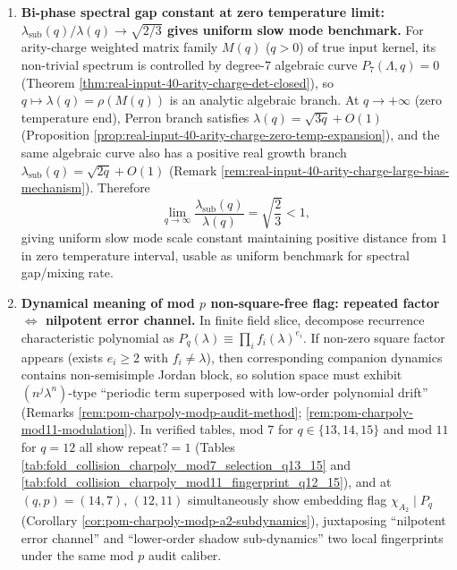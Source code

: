 \begin{enumerate}
  \item \textbf{Bi-phase spectral gap constant at zero temperature limit: \texorpdfstring{$\lambda_{\mathrm{sub}}(q)/\lambda(q)\to\sqrt{2/3}$}{lambda_sub/lambda -> sqrt(2/3)} gives uniform slow mode benchmark.}
  For arity-charge weighted matrix family \(M(q)\) (\(q>0\)) of true input kernel, its non-trivial spectrum is controlled by degree-\(7\) algebraic curve \(P_7(\Lambda,q)=0\) (Theorem \ref{thm:real-input-40-arity-charge-det-closed}), so \(q\mapsto\lambda(q)=\rho(M(q))\) is an analytic algebraic branch.
  At \(q\to+\infty\) (zero temperature end), Perron branch satisfies
  \(
  \lambda(q)=\sqrt{3q}+O(1)
  \)
  (Proposition \ref{prop:real-input-40-arity-charge-zero-temp-expansion}), and the same algebraic curve also has a positive real growth branch
  \(
  \lambda_{\mathrm{sub}}(q)=\sqrt{2q}+O(1)
  \)
  (Remark \ref{rem:real-input-40-arity-charge-large-bias-mechanism}).
  Therefore
  \[
  \lim_{q\to\infty}\frac{\lambda_{\mathrm{sub}}(q)}{\lambda(q)}=\sqrt{\frac{2}{3}}<1,
  \]
  giving uniform slow mode scale constant maintaining positive distance from \(1\) in zero temperature interval, usable as uniform benchmark for spectral gap/mixing rate.

  \item \textbf{Dynamical meaning of mod \texorpdfstring{$p$}{p} non-square-free flag: repeated factor \texorpdfstring{$\Leftrightarrow$}{<->} nilpotent error channel.}
  In finite field slice, decompose recurrence characteristic polynomial as
  \(P_q(\lambda)\equiv\prod_i f_i(\lambda)^{e_i}\).
  If non-zero square factor appears (exists \(e_i\ge 2\) with \(f_i\neq\lambda\)), then corresponding companion dynamics contains non-semisimple Jordan block, so solution space must exhibit \((n^j\lambda^n)\)-type ``periodic term superposed with low-order polynomial drift'' (Remarks \ref{rem:pom-charpoly-modp-audit-method}; \ref{rem:pom-charpoly-mod11-modulation}).
  In verified tables, mod \(7\) for \(q\in\{13,14,15\}\) and mod \(11\) for \(q=12\) all show \(\mathrm{repeat?}=1\) (Tables \ref{tab:fold_collision_charpoly_mod7_selection_q13_15} and \ref{tab:fold_collision_charpoly_mod11_fingerprint_q12_15}), and at \((q,p)=(14,7)\), \((12,11)\) simultaneously show embedding flag \(\chi_{A_2}\mid P_q\) (Corollary \ref{cor:pom-charpoly-modp-a2-subdynamics}), juxtaposing ``nilpotent error channel'' and ``lower-order shadow sub-dynamics'' two local fingerprints under the same mod \(p\) audit caliber.


\end{enumerate}
